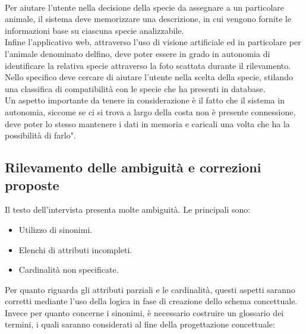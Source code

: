 \documentclass[a4paper,final,12pt]{report}
\begin{document}
\\
Per aiutare l'utente nella decisione della specie da assegnare a un particolare animale, il sistema deve memorizzare una descrizione, in cui vengono fornite le informazioni base su ciascuna specie analizzabile.
\\
Infine l'applicativo web, attraverso l'uso di visione artificiale ed in particolare per l'animale denominato delfino, deve poter essere in grado in autonomia di identificare la relativa specie attraverso la foto scattata durante il rilevamento. Nello specifico deve cercare di aiutare l'utente nella scelta della specie, stilando una classifica di compatibilità con le specie che ha presenti in database.
\\
Un aspetto importante da tenere in considerazione è il fatto che il sistema in autonomia, siccome se ci si trova a largo della costa non è presente connessione, deve poter lo stesso mantenere i dati in memoria e caricali una volta che ha la possibilità di farlo".

\subsection{Rilevamento delle ambiguità e correzioni proposte}
Il testo dell'intervista presenta molte ambiguità. Le principali sono:
\begin{itemize}
\item Utilizzo di sinonimi.
\item Elenchi di attributi incompleti.
\item Cardinalità non specificate.
\end{itemize}

Per quanto riguarda gli attributi parziali e le cardinalità, questi aspetti saranno corretti mediante l'uso della logica in fase di creazione dello schema concettuale. Invece per quanto concerne i sinonimi, è necessario costruire un glossario dei termini, i quali saranno considerati al fine della progettazione concettuale:
\end{document}
